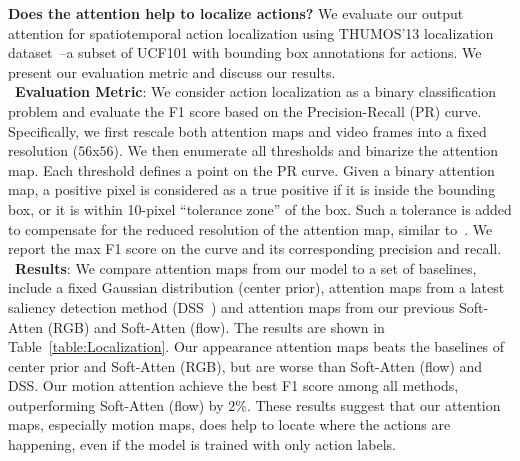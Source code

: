 \documentclass[10pt,twocolumn,letterpaper]{article}
\begin{document}
\noindent \textbf{Does the attention help to localize actions?} We evaluate our output attention for spatiotemporal action localization using THUMOS'13 localization dataset~\cite{idrees2017thumos}--a subset of UCF101 with bounding box annotations for actions. We present our evaluation metric and discuss our results.\\
\noindent \textbullet\ \textbf{Evaluation Metric}: We consider action localization as a binary classification problem and evaluate the F1 score based on the Precision-Recall (PR) curve. Specifically, we first rescale both attention maps and video frames into a fixed resolution ($56$x$56$). We then enumerate all thresholds and binarize the attention map. Each threshold defines a point on the PR curve. Given a binary attention map, a positive pixel is considered as a true positive if it is inside the bounding box, or it is within 10-pixel ``tolerance zone'' of the box. Such a tolerance is added to compensate for the reduced resolution of the attention map, similar to~\cite{oquab2015object}. We report the max F1 score on the curve and its corresponding precision and recall.\\ 
\noindent \textbullet\ \textbf{Results}: We compare attention maps from our model to a set of baselines, include a fixed Gaussian distribution (center prior), attention maps from a latest saliency detection method (DSS~\cite{hou2017deeply}) and attention maps from our previous Soft-Atten (RGB) and Soft-Atten (flow). The results are shown in Table~\ref{table:Localization}. Our appearance attention maps beats the baselines of center prior and Soft-Atten (RGB), but are worse than Soft-Atten (flow) and DSS. Our motion attention achieve the best F1 score among all methods, outperforming Soft-Atten (flow) by $2\%$. These results suggest that our attention maps, especially motion maps, does help to locate where the actions are happening, even if the model is trained with only action labels.  
\end{document}
